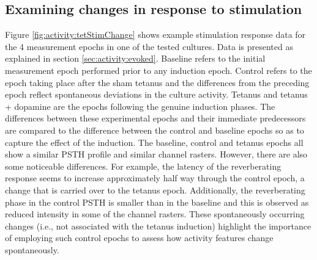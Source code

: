     \subsection{Examining changes in response to stimulation}
    Figure \ref{fig:activity:tetStimChange} shows example stimulation response data for the 4 measurement epochs in one of the tested cultures. Data is presented as explained in section \ref{sec:activity:evoked}. Baseline refers to the initial measurement epoch performed prior to any induction epoch. Control refers to the epoch taking place after the sham tetanus and the differences from the preceding epoch reflect spontaneous deviations in the culture activity. Tetanus and tetanus + dopamine are the epochs following the genuine induction phases. The differences between these experimental epochs and their immediate predecessors are compared to the difference between the control and baseline epochs so as to capture the effect of the induction. The baseline, control and tetanus epochs all show a similar PSTH profile and similar channel rasters. However, there are also some noticeable differences. For example, the latency of the reverberating response seems to increase approximately half way through the control epoch, a change that is carried over to the tetanus epoch. Additionally, the reverberating phase in the control PSTH is smaller than in the baseline and this is observed as reduced intensity in some of the channel rasters. These spontaneously occurring changes (i.e., not associated with the tetanus induction) highlight the importance of employing such control epochs to assess how activity features change spontaneously.

